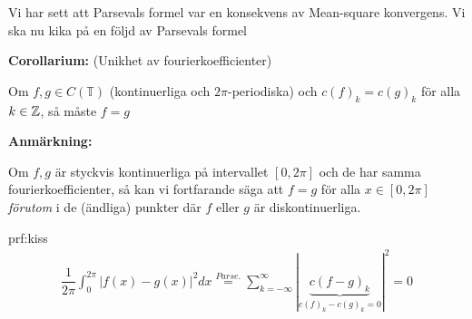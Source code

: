 \noindent Vi har sett att Parsevals formel var en konsekvens av Mean-square konvergens. Vi ska nu kika på en följd av Parsevals formel
\par\bigskip
\noindent\textbf{Corollarium:} (Unikhet av fourierkoefficienter)\par
\noindent Om $f,g\in C(\mathbb{T})$ (kontinuerliga och $2\pi$-periodiska) och $c(f)_k = c(g)_k$ för alla $k\in\mathbb{Z}$, så måste $f = g$
\par\bigskip
\noindent\textbf{Anmärkning:}\par
\noindent Om $f,g$ är styckvis kontinuerliga på intervallet $[0,2\pi]$ och de har samma fourierkoefficienter, så kan vi fortfarande säga att $f=g$ för alla $x\in[0,2\pi]$ \textit{förutom} i de (ändliga) punkter där $f$ eller $g$ är diskontinuerliga. 
\par\bigskip
\begin{prf}[Skiss]{prf:kiss}
  \begin{equation*}
    \begin{gathered}
      \dfrac{1}{2\pi}\int_{0}^{2\pi}\left|f(x)-g(x)\right|^2dx \stackrel{Parse.}{=}\sum_{k=-\infty}^{\infty}|\underbrace{c(f-g)_k}_{\text{$c(f)_k-c(g)_k = 0$}}|^2 = 0
    \end{gathered}
  \end{equation*}
\end{prf}
\newpage
